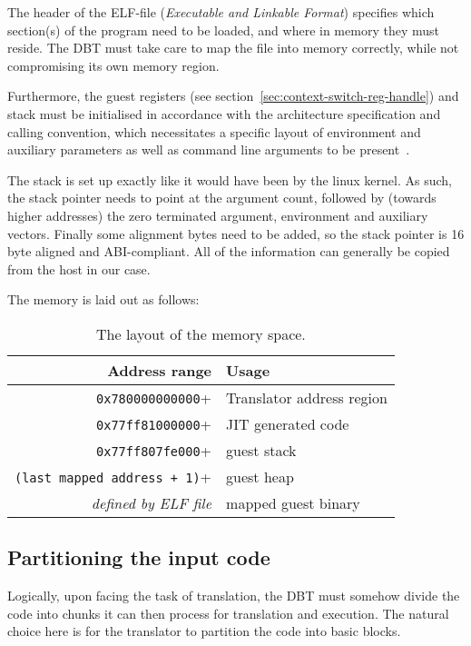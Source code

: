 The header of the ELF-file (\textit{Executable and Linkable Format}) specifies which section(s) of the program need to be loaded, and where in memory they must reside.
The DBT must take care to map the file into memory correctly, while not compromising its own memory region.

Furthermore, the guest registers (see section~\ref{sec:context-switch-reg-handle}) and stack must be initialised in accordance with the architecture specification and calling convention, which necessitates a specific layout of environment and auxiliary parameters as well as command line arguments to be present~\cite[S. 2]{bintrans}.

The stack is set up exactly like it would have been by the linux kernel.
As such, the stack pointer needs to point at the argument count, followed by (towards higher addresses) the zero terminated argument, environment and auxiliary vectors.
Finally some alignment bytes need to be added, so the stack pointer is 16 byte aligned and ABI-compliant.
All of the information can generally be copied from the host in our case.

The memory is laid out as follows:
\begin{table}[h]
	\centering
	\begin{tabular}{rl}
		\toprule
		\textbf{Address range} & \textbf{Usage}\\
		\midrule
		\texttt{0x780000000000}+ & Translator address region\\
		\texttt{0x77ff81000000}+ & JIT generated code\\
		\texttt{0x77ff807fe000}+ & guest stack\\
		\texttt{(last mapped address + 1)}+ & guest heap\\
		\textit{defined by ELF file} & mapped guest binary\\
		\bottomrule
	\end{tabular}
	\caption[Memory layout]%
	{The layout of the memory space.}
	\label{tab:}
\end{table}


\subsection{Partitioning the input code}
Logically, upon facing the task of translation, the DBT must somehow divide the code into chunks it can then process for translation and execution.
The natural choice here is for the translator to partition the code into basic blocks.

